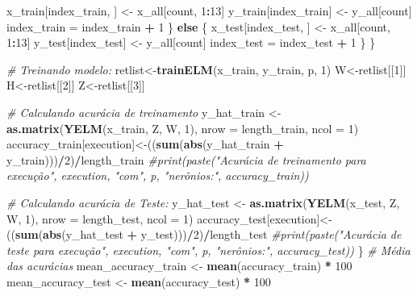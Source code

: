 \documentclass[
]{article}
\newenvironment{Shaded}{\begin{snugshade}}{\end{snugshade}}
\newcommand{\CommentTok}[1]{\textcolor[rgb]{0.56,0.35,0.01}{\textit{#1}}}
\newcommand{\ControlFlowTok}[1]{\textcolor[rgb]{0.13,0.29,0.53}{\textbf{#1}}}
\newcommand{\DataTypeTok}[1]{\textcolor[rgb]{0.13,0.29,0.53}{#1}}
\newcommand{\DecValTok}[1]{\textcolor[rgb]{0.00,0.00,0.81}{#1}}
\newcommand{\KeywordTok}[1]{\textcolor[rgb]{0.13,0.29,0.53}{\textbf{#1}}}
\newcommand{\NormalTok}[1]{#1}
\newcommand{\OperatorTok}[1]{\textcolor[rgb]{0.81,0.36,0.00}{\textbf{#1}}}
\newcommand{\StringTok}[1]{\textcolor[rgb]{0.31,0.60,0.02}{#1}}
\begin{document}
\begin{Shaded}
\begin{Highlighting}[]
\NormalTok{        x_train[index_train, ] <-}\StringTok{ }\NormalTok{x_all[count, }\DecValTok{1}\OperatorTok{:}\DecValTok{13}\NormalTok{]}
\NormalTok{        y_train[index_train] <-}\StringTok{ }\NormalTok{y_all[count]}
\NormalTok{        index_train =}\StringTok{ }\NormalTok{index_train }\OperatorTok{+}\StringTok{ }\DecValTok{1}
\NormalTok{      \} }\ControlFlowTok{else}\NormalTok{ \{}
\NormalTok{        x_test[index_test, ] <-}\StringTok{ }\NormalTok{x_all[count, }\DecValTok{1}\OperatorTok{:}\DecValTok{13}\NormalTok{]}
\NormalTok{        y_test[index_test] <-}\StringTok{ }\NormalTok{y_all[count]}
\NormalTok{        index_test =}\StringTok{ }\NormalTok{index_test }\OperatorTok{+}\StringTok{ }\DecValTok{1}    
\NormalTok{      \}}
\NormalTok{    \}}
    
    \CommentTok{# Treinando modelo:}
\NormalTok{    retlist<-}\KeywordTok{trainELM}\NormalTok{(x_train, y_train, p, }\DecValTok{1}\NormalTok{)}
\NormalTok{    W<-retlist[[}\DecValTok{1}\NormalTok{]]}
\NormalTok{    H<-retlist[[}\DecValTok{2}\NormalTok{]]}
\NormalTok{    Z<-retlist[[}\DecValTok{3}\NormalTok{]]}
    
    \CommentTok{# Calculando acurácia de treinamento}
\NormalTok{    y_hat_train <-}\StringTok{ }\KeywordTok{as.matrix}\NormalTok{(}\KeywordTok{YELM}\NormalTok{(x_train, Z, W, }\DecValTok{1}\NormalTok{), }\DataTypeTok{nrow =}\NormalTok{ length_train, }\DataTypeTok{ncol =} \DecValTok{1}\NormalTok{)}
\NormalTok{    accuracy_train[execution]<-((}\KeywordTok{sum}\NormalTok{(}\KeywordTok{abs}\NormalTok{(y_hat_train }\OperatorTok{+}\StringTok{ }\NormalTok{y_train)))}\OperatorTok{/}\DecValTok{2}\NormalTok{)}\OperatorTok{/}\NormalTok{length_train}
    \CommentTok{#print(paste("Acurácia de treinamento para execução", execution, "com", p, "nerônios:", accuracy_train))}
    
    \CommentTok{# Calculando acurácia de Teste:}
\NormalTok{    y_hat_test <-}\StringTok{ }\KeywordTok{as.matrix}\NormalTok{(}\KeywordTok{YELM}\NormalTok{(x_test, Z, W, }\DecValTok{1}\NormalTok{), }\DataTypeTok{nrow =}\NormalTok{ length_test, }\DataTypeTok{ncol =} \DecValTok{1}\NormalTok{)}
\NormalTok{    accuracy_test[execution]<-((}\KeywordTok{sum}\NormalTok{(}\KeywordTok{abs}\NormalTok{(y_hat_test }\OperatorTok{+}\StringTok{ }\NormalTok{y_test)))}\OperatorTok{/}\DecValTok{2}\NormalTok{)}\OperatorTok{/}\NormalTok{length_test}
    \CommentTok{#print(paste("Acurácia de teste para execução", execution, "com", p, "nerônios:", accuracy_test))}
\NormalTok{  \}}
  \CommentTok{# Média das acurácias}
\NormalTok{  mean_accuracy_train <-}\StringTok{ }\KeywordTok{mean}\NormalTok{(accuracy_train) }\OperatorTok{*}\StringTok{ }\DecValTok{100}
\NormalTok{  mean_accuracy_test <-}\StringTok{ }\KeywordTok{mean}\NormalTok{(accuracy_test) }\OperatorTok{*}\StringTok{ }\DecValTok{100}
  

\end{Highlighting}
\end{Shaded}
\end{document}
